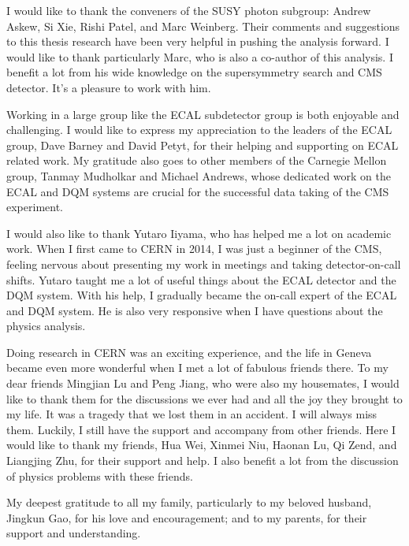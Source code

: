 \documentclass[12pt,oneside]{memoir}
\begin{document}
I would like to thank the conveners of the SUSY photon subgroup: Andrew Askew, Si Xie, Rishi Patel, and Marc Weinberg. Their comments and suggestions to this thesis research have been very helpful in pushing the analysis forward. I would like to thank particularly Marc, who is also a co-author of this analysis. I benefit a lot from his wide knowledge on the supersymmetry search and CMS detector. It's a pleasure to work with him.  

Working in a large group like the ECAL subdetector group is both enjoyable and challenging. I would like to express my appreciation to the leaders of the ECAL group, Dave Barney and David Petyt, for their helping and supporting on ECAL related work. My gratitude also goes to other members of the Carnegie Mellon group, Tanmay Mudholkar and Michael Andrews, whose dedicated work on the ECAL and DQM systems are crucial for the successful data taking of the CMS experiment.  

I would also like to thank Yutaro Iiyama, who has helped me a lot on academic work. When I first came to CERN in 2014, I was just a beginner of the CMS, feeling nervous about presenting my work in meetings and taking detector-on-call shifts. Yutaro taught me a lot of useful things about the ECAL detector and the DQM system. With his help, I gradually became the on-call expert of the ECAL and DQM system. He is also very responsive when I have questions about the physics analysis. 

Doing research in CERN was an exciting experience, and the life in Geneva became even more wonderful when I met a lot of fabulous friends there. 
To my dear friends Mingjian Lu and Peng Jiang, who were also my housemates, I would like to thank them for the discussions we ever had and all the joy they brought to my life. 
It was a tragedy that we lost them in an accident. I will always miss them. 
Luckily, I still have the support and accompany from other friends. 
Here I would like to thank my friends, Hua Wei, Xinmei Niu, Haonan Lu, Qi Zend, and Liangjing Zhu, for their support and help. 
I also benefit a lot from the discussion of physics problems with these friends. 

My deepest gratitude to all my family, particularly to my beloved husband, Jingkun Gao, for his love and encouragement; and to my parents, for their support and understanding.  


\newpage
\tableofcontents
\newpage
\listoftables
\newpage
\listoffigures

\clearpage 
\end{document}
